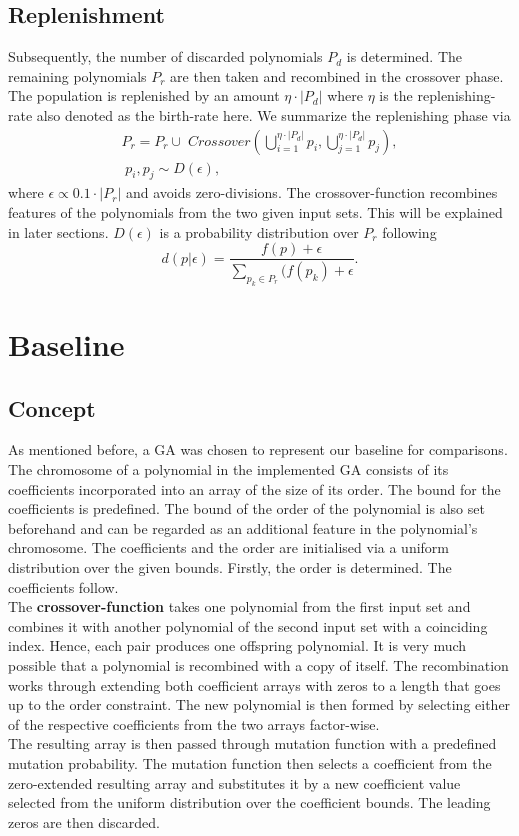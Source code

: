 \documentclass[11pt,a4paper]{article}
\begin{document}
\subsection*{Replenishment}
Subsequently, the number of discarded polynomials $P_d$ is determined. The remaining polynomials $P_r$ are then taken and recombined in the crossover phase. The population is replenished by an amount $\eta \cdot |P_d|$ where $\eta$ is the replenishing-rate also denoted as the birth-rate here. We summarize the replenishing phase via
\begin{align*}
P_r = P_r \cup \; Crossover \left(\bigcup_{i=1}^{\eta \cdot |P_d|} p_i, \bigcup_{j=1}^{\eta \cdot |P_d|} p_j\right), \\ \; p_i, p_j \sim D(\epsilon),
\end{align*}
where $\epsilon \propto 0.1 \cdot |P_r|$ and avoids zero-divisions. The crossover-function recombines features of the polynomials from the two given input sets. This will be explained in later sections. $D(\epsilon)$ is a probability distribution over $P_r$ following 
\[ 
d(p|\epsilon)= \frac{f(p)+\epsilon}{\sum_{p_k \in P_r} (f(p_k) + \epsilon}.
\]
\section*{Baseline}
\subsection*{Concept}
As mentioned before, a GA was chosen to represent our baseline for comparisons. \\
The chromosome of a polynomial in the implemented GA consists of its coefficients incorporated into an array of the size of its order. The bound for the coefficients is predefined. The bound of the order of the polynomial is also set beforehand and can be regarded as an additional feature in the polynomial's chromosome. The coefficients and the order are initialised via a uniform distribution over the given bounds. Firstly, the order is determined. The coefficients follow. \\
The {\bf crossover-function} takes one polynomial from the first input set and combines it with another polynomial of the second input set with a coinciding index. Hence, each pair produces one offspring polynomial. It is very much possible that a polynomial is recombined with a copy of itself. The recombination works through extending both coefficient arrays with zeros to a length that goes up to the order constraint. The new polynomial is then formed by selecting either of the respective coefficients from the two arrays factor-wise. \\
The resulting array is then passed through mutation function with a predefined mutation probability. The mutation function then selects a coefficient from the zero-extended resulting array and substitutes it by a new coefficient value selected from the uniform distribution over the coefficient bounds. The leading zeros are then discarded.
\end{document}
